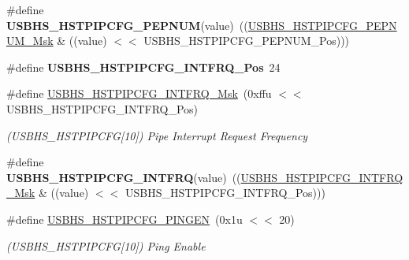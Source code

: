 \begin{DoxyCompactItemize}
\mbox{\label{group__SAME70__USBHS_ga747426e0b642ef7265ed29f97289fe1e}} 
\#define {\bfseries U\+S\+B\+H\+S\+\_\+\+H\+S\+T\+P\+I\+P\+C\+F\+G\+\_\+\+P\+E\+P\+N\+UM}(value)~((\mbox{\hyperlink{group__SAMV71__USBHS_gae4c427ae7b00860d3e38d2fb3a3b1cd5}{U\+S\+B\+H\+S\+\_\+\+H\+S\+T\+P\+I\+P\+C\+F\+G\+\_\+\+P\+E\+P\+N\+U\+M\+\_\+\+Msk}} \& ((value) $<$$<$ U\+S\+B\+H\+S\+\_\+\+H\+S\+T\+P\+I\+P\+C\+F\+G\+\_\+\+P\+E\+P\+N\+U\+M\+\_\+\+Pos)))
\item 
\mbox{\label{group__SAME70__USBHS_ga23bd8cae85e668996cae3c7113652b35}} 
\#define {\bfseries U\+S\+B\+H\+S\+\_\+\+H\+S\+T\+P\+I\+P\+C\+F\+G\+\_\+\+I\+N\+T\+F\+R\+Q\+\_\+\+Pos}~24
\item 
\mbox{\label{group__SAME70__USBHS_ga0861796b9d288b3bb1aab1e85fafec77}} 
\#define \mbox{\hyperlink{group__SAME70__USBHS_ga0861796b9d288b3bb1aab1e85fafec77}{U\+S\+B\+H\+S\+\_\+\+H\+S\+T\+P\+I\+P\+C\+F\+G\+\_\+\+I\+N\+T\+F\+R\+Q\+\_\+\+Msk}}~(0xffu $<$$<$ U\+S\+B\+H\+S\+\_\+\+H\+S\+T\+P\+I\+P\+C\+F\+G\+\_\+\+I\+N\+T\+F\+R\+Q\+\_\+\+Pos)
\begin{DoxyCompactList}\small\item\em (U\+S\+B\+H\+S\+\_\+\+H\+S\+T\+P\+I\+P\+C\+FG\mbox{[}10\mbox{]}) Pipe Interrupt Request Frequency \end{DoxyCompactList}\item 
\mbox{\label{group__SAME70__USBHS_ga90973477f99168dd1b9b62c671c5ae2b}} 
\#define {\bfseries U\+S\+B\+H\+S\+\_\+\+H\+S\+T\+P\+I\+P\+C\+F\+G\+\_\+\+I\+N\+T\+F\+RQ}(value)~((\mbox{\hyperlink{group__SAMV71__USBHS_ga0861796b9d288b3bb1aab1e85fafec77}{U\+S\+B\+H\+S\+\_\+\+H\+S\+T\+P\+I\+P\+C\+F\+G\+\_\+\+I\+N\+T\+F\+R\+Q\+\_\+\+Msk}} \& ((value) $<$$<$ U\+S\+B\+H\+S\+\_\+\+H\+S\+T\+P\+I\+P\+C\+F\+G\+\_\+\+I\+N\+T\+F\+R\+Q\+\_\+\+Pos)))
\item 
\mbox{\label{group__SAME70__USBHS_gaf0809494feabaf66ffe5b26414f8fd1f}} 
\#define \mbox{\hyperlink{group__SAME70__USBHS_gaf0809494feabaf66ffe5b26414f8fd1f}{U\+S\+B\+H\+S\+\_\+\+H\+S\+T\+P\+I\+P\+C\+F\+G\+\_\+\+P\+I\+N\+G\+EN}}~(0x1u $<$$<$ 20)
\begin{DoxyCompactList}\small\item\em (U\+S\+B\+H\+S\+\_\+\+H\+S\+T\+P\+I\+P\+C\+FG\mbox{[}10\mbox{]}) Ping Enable \end{DoxyCompactList}\item 

\end{DoxyCompactItemize}
